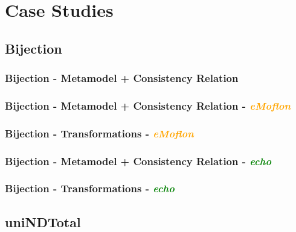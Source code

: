 \documentclass{beamer}
\begin{document}




\section{Case Studies}

\subsection{Bijection}

\begin{frame}
\frametitle{\textbf{Bijection} - \textbf{Metamodel + Consistency Relation}}

\end{frame}


\begin{frame}
\frametitle{Bijection - \textbf{Metamodel + Consistency Relation} - \textbf{\textit{\textcolor{orange}{eMoflon}}}}

\end{frame}

\begin{frame}
\frametitle{Bijection - \textbf{Transformations} - \textbf{\textit{\textcolor{orange}{eMoflon}}}}

\end{frame}


\begin{frame}
\frametitle{Bijection - \textbf{Metamodel + Consistency Relation} - \textbf{\textit{\textcolor{green}{echo}}}}

\end{frame}

\begin{frame}
\frametitle{Bijection - \textbf{Transformations} - \textbf{\textit{\textcolor{green}{echo}}}}

\end{frame}









\subsection{uniNDTotal}
\end{document}
